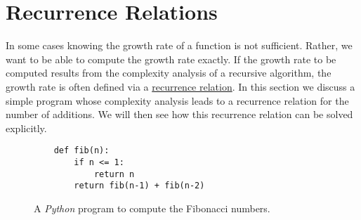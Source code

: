 \section{Recurrence Relations}
In some cases knowing the growth rate of a function is not sufficient.  Rather, we want to be able to compute
the growth rate exactly.  If the growth rate to be computed results from the complexity analysis of a recursive
algorithm, the growth rate is often defined via a \href{https://en.wikipedia.org/wiki/Recurrence_relation}{recurrence relation}.
In this section we discuss a simple program whose complexity analysis leads to a recurrence relation for the 
number of additions.  We will then see how this recurrence relation can be solved explicitly.

\begin{figure}[!h]
  \centering
\begin{verbatim}
    def fib(n):
        if n <= 1:
            return n
        return fib(n-1) + fib(n-2)
\end{verbatim}
\vspace*{-0.3cm}
  \caption{A \textsl{Python} program to compute the Fibonacci numbers.}
  \label{fig:Fibonacci.ipynb}
\end{figure} 

